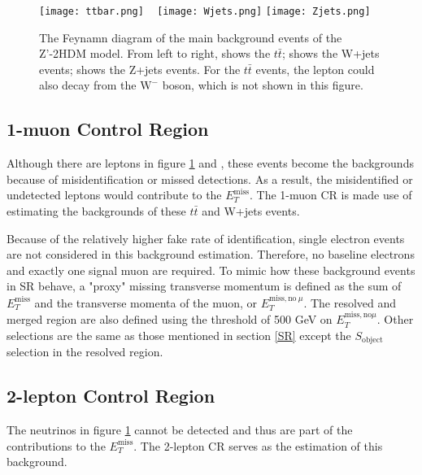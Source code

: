 \documentclass[class=NCU_thesis, crop=false]{standalone}
\begin{document}
	\begin{figure}[!hbt]
		\centering
		\subcaptionbox
		{\label{fig:subfig_ttbar}}
		{\texttt{[image: ttbar.png]}}
		~
		\subcaptionbox
		{\label{fig:subfig_Wjets}}
		{\texttt{[image: Wjets.png]}}
		\subcaptionbox
		{\label{fig:subfig_Zjets}}
		{\texttt{[image: Zjets.png]}}
		\caption{The Feynamn diagram of the main background events of the Z'-2HDM model. From left to right,  shows the $t\bar{t}$;  shows the W+jets events;  shows the Z+jets events. For the $t\bar{t}$ events, the lepton could also decay from the $\mathrm{W^-}$ boson, which is not shown in this figure.}
		\label{fig:background}
	\end{figure}

	\subsection{1-muon Control Region}
		Although there are leptons in figure \ref{fig:background}  and , these events become the backgrounds because of misidentification or missed detections. As a result, the misidentified or undetected leptons would contribute to the $E_T^{\mathrm{miss}}$. The 1-muon CR is made use of estimating the backgrounds of these $t\bar{t}$ and W+jets events.
	
		Because of the relatively higher fake rate of identification, single electron events are not considered in this background estimation. Therefore, no baseline electrons and exactly one signal muon are required. To mimic how these background events in SR behave, a "proxy" missing transverse momentum is defined as the sum of $E_T^{\mathrm{miss}}$ and the transverse momenta of the muon, or $E_T^{\mathrm{miss, no}\ \mu}$. The resolved and merged region are also defined using the threshold of 500 GeV on $E_T^{\mathrm{miss, no } \mu}$. Other selections are the same as those mentioned in section \ref{SR} except the $S_{\mathrm{object}}$ selection in the resolved region.
	
	\subsection{2-lepton Control Region}\label{2LCR}
		The neutrinos in figure \ref{fig:background}  cannot be detected and thus are part of the contributions to the $E_T^{\mathrm{miss}}$. The 2-lepton CR serves as the estimation of this background.
		
\end{document}
